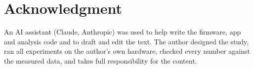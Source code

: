 \documentclass[journal]{IEEEtran}
\begin{document}
\section*{Acknowledgment}
An AI assistant (Claude, Anthropic) was used to help write the firmware,
app and analysis code and to draft and edit the text. The author designed
the study, ran all experiments on the author's own hardware, checked every number
against the measured data, and takes full responsibility for the content.



\end{document}
